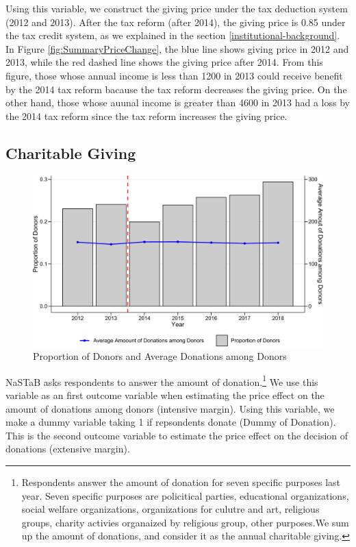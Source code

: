 \documentclass[ review  , 3p ]{elsarticle}
\begin{document}
  Using this variable, we construct the giving price under the tax deduction system (2012 and 2013).
  After the tax reform (after 2014), the giving price is 0.85 under the tax credit system,
  as we explained in the section \ref{institutional-background}.
  In Figure \ref{fig:SummaryPriceChange},
  the blue line shows giving price in 2012 and 2013,
  while the red dashed line shows the giving price after 2014.
  From this figure,
  those whose annual income is less than 1200 in 2013 could receive benefit by the 2014 tax reform
  bacause the tax reform decreases the giving price.
  On the other hand,
  those whose auunal income is greater than 4600 in 2013 had a loss by the 2014 tax reform
  since the tax reform increases the giving price.

  \hypertarget{charitable-giving}{%
  \subsection{Charitable Giving}\label{charitable-giving}}

  \begin{figure}[t]

  {\centering \includegraphics[width=0.9\linewidth]{draft_files/figure-latex/SummaryOutcome-1} 

  }

  \caption{Proportion of Donors and Average Donations among Donors}\label{fig:SummaryOutcome}
  \end{figure}

  NaSTaB asks respondents to answer the amount of donation.\footnote{Respondents answer the amount of donation for seven specific purposes last year. Seven specific purposes are policitical parties, educational organizations, social welfare organizations, organizations for culutre and art, religious groups, charity activies organaized by religious group, other purposes.We sum up the amount of donations, and consider it as the annual charitable giving.}
  We use this variable as an first outcome variable when
  estimating the price effect on the amount of donations among donors (intensive margin).
  Using this variable, we make a dummy variable taking 1 if repsondents donate (Dummy of Donation).
  This is the second outcome variable
  to estimate the price effect on the decision of donations (extensive margin).
\end{document}
